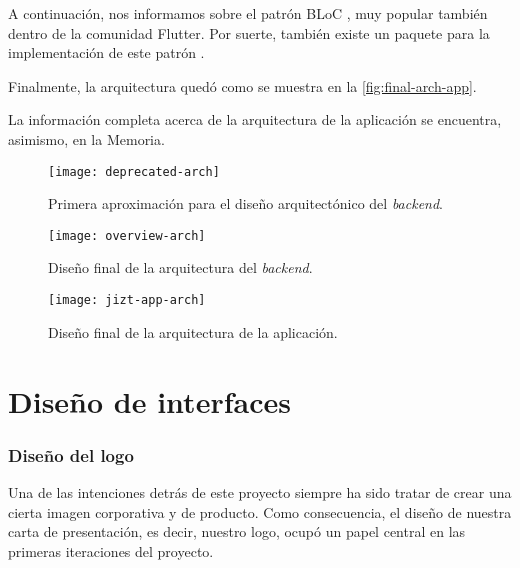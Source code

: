A continuación, nos informamos sobre el patrón BLoC \cite{bloc-pattern}, muy popular también dentro de la comunidad Flutter. Por suerte, también existe un paquete para la implementación de este patrón \cite{bloc-package}.

Finalmente, la arquitectura quedó como se muestra en la \autoref{fig:final-arch-app}.

La información completa acerca de la arquitectura de la aplicación se encuentra, asimismo, en la Memoria.

\newpage

\vspace*{2cm}

\begin{figure}[h!]
	\centering
	\texttt{[image: deprecated-arch]}
	\vspace{-0.5cm}
	\caption{Primera aproximación para el diseño arquitectónico del \emph{backend}.}
	\label{fig:deprecated-arch}
\end{figure}

\newpage

\vspace*{2cm}

\begin{figure}[h!]
	\centering
	\texttt{[image: overview-arch]}
	\vspace{-0.5cm}
	\caption{Diseño final de la arquitectura del \emph{backend}.}
	\label{fig:final-arch-backend}
\end{figure}

\begin{figure}[h!]
	\centering
	\texttt{[image: jizt-app-arch]}
	\vspace{-0.5cm}
	\caption{Diseño final de la arquitectura de la aplicación.}
	\label{fig:final-arch-app}
\end{figure}

\newpage

\section{Diseño de interfaces}

\subsubsection{Diseño del logo}

Una de las intenciones detrás de este proyecto siempre ha sido tratar de crear una cierta imagen corporativa y de producto. Como consecuencia, el diseño de nuestra carta de presentación, es decir, nuestro logo, ocupó un papel central en las primeras iteraciones del proyecto.

